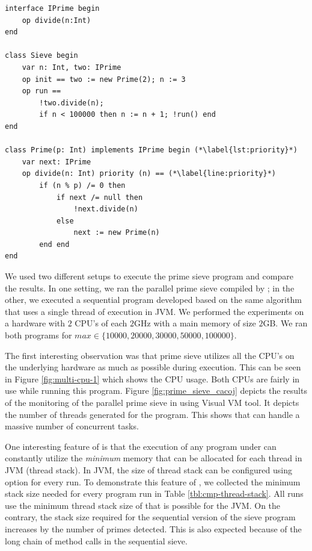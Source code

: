 \begin{lstlisting}[float=t, label=lst:prime-sieve-creol, caption=Prime Sieve in Creol]
interface IPrime begin
	op divide(n:Int)
end

class Sieve begin
	var n: Int, two: IPrime
	op init == two := new Prime(2); n := 3
	op run ==
		!two.divide(n);
		if n < 100000 then n := n + 1; !run() end
end

class Prime(p: Int) implements IPrime begin (*\label{lst:priority}*)
	var next: IPrime
	op divide(n: Int) priority (n) == (*\label{line:priority}*)
		if (n % p) /= 0 then 
			if next /= null then
				!next.divide(n)
			else
				next := new Prime(n)
		end end
end
\end{lstlisting}
% 

We used two different setups to execute the prime sieve program and compare the results. In one setting, we ran the parallel prime sieve compiled by \Crisp; in the other, we executed a sequential program developed based on the same algorithm that uses a single thread of execution in JVM. We performed the experiments on a hardware with $2$ CPU's of each $2$GHz with a main memory of size $2$GB. We ran both programs for $max \in \{10000, 20000, 30000, 50000, 100000\}$.

The first interesting observation was that \Crisp prime sieve utilizes all the CPU's on the underlying hardware as much as possible during  execution. 
This can be seen in Figure \ref{fig:multi-cpu-1} which shows the CPU usage. 
Both CPUs are fairly in use while running this program.
Figure \ref{fig:prime_sieve_cacoj} depicts the results of the monitoring of the parallel prime sieve in \Crisp using Visual VM tool. 
It depicts the number of threads generated for the program.
This shows that \Crisp can handle a massive number of concurrent tasks.


One interesting feature of \Crisp is that the execution of any program under \Crisp can constantly utilize the \emph{minimum} memory that can be allocated for each thread in JVM (thread stack). 
In JVM, the size of thread stack can be configured using  option for every run. 
To demonstrate this feature of \Crisp, we collected the minimum stack size needed for every program run in Table \ref{tbl:cmp-thread-stack}. 
All \Crisp runs use the minimum thread stack size of  that is possible for the JVM.
On the contrary, the stack size required for the sequential version of the sieve program increases by the number of primes detected. 
This is also expected because of the long chain of method calls in the sequential sieve.

